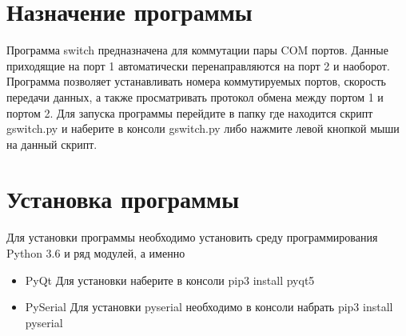 \documentclass[12pt]{article}[a4paper,14pt,russian]
\begin{document}
\section{Назначение программы}
Программа switch предназначена для коммутации пары COM портов. Данные приходящие на порт 1 автоматически перенаправляются на порт 2 и наоборот.
Программа позволяет устанавливать номера коммутируемых портов, скорость передачи данных, а также просматривать протокол обмена между портом 1 и портом 2. Для запуска программы перейдите в папку где находится скрипт gswitch.py и наберите в консоли gswitch.py либо нажмите левой кнопкой мыши на данный скрипт.
\section{Установка программы}
Для установки программы необходимо установить среду программирования Python 3.6 и ряд модулей, а именно
\begin{itemize}
	\item PyQt
	Для установки наберите в консоли
	pip3 install pyqt5
	\item PySerial
	Для установки pyserial необходимо в консоли набрать
	pip3 install pyserial

\end{itemize}
\end{document}
